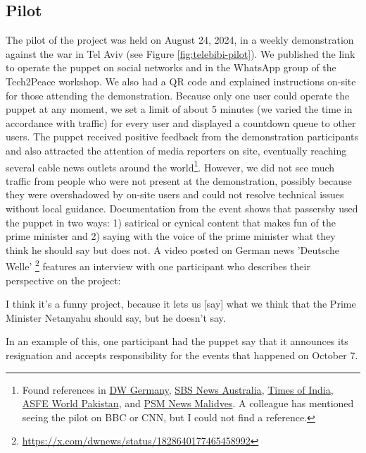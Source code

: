 \documentclass[dissertation,math,vertlayout,pdfa,colorlinks]{aaltoseries}
\begin{document}
\subsection{Pilot}
The pilot of the project was held on August 24, 2024, in a weekly demonstration against the war in Tel Aviv (see Figure \ref{fig:telebibi-pilot}). We published the link to operate the puppet on social networks and in the WhatsApp group of the Tech2Peace workshop. We also had a QR code and explained instructions on-site for those attending the demonstration. Because only one user could operate the puppet at any moment, we set a limit of about 5 minutes (we varied the time in accordance with traffic) for every user and displayed a countdown queue to other users. The puppet received positive feedback from the demonstration participants and also attracted the attention of media reporters on site, eventually reaching several cable news outlets around the world\footnote{Found references in \href{https://x.com/dwnews/status/1828640177465458992}{DW Germany}, \href{https://www.sbs.com.au/news/podcast-episode/un-says-israels-evacuations-in-gaza-are-preventing-delivery-of-much-needed-aid/zqa3zty03}{SBS News Australia}, \href{https://timesofindia.indiatimes.com/world/middle-east/israelis-demand-hostages-release-in-protest-against-netanyahus-government-in-tel-aviv/amp_etphotostory/112785127.cms}{Times of India}, \href{https://www.youtube.com/watch?v=v4O4sitNG-g}{ASFE World Pakistan}, and \href{https://www.youtube.com/live/Kd8cJ3snLKU?t=1384s}{PSM News Malidves}.  A colleague has mentioned seeing the pilot on BBC or CNN, but I could not find a reference.}. However, we did not see much traffic from people who were not present at the demonstration, possibly because they were overshadowed by on-site users and could not resolve technical issues without local guidance. Documentation from the event shows that passersby used the puppet in two ways: 1) satirical or cynical content that makes fun of the prime minister and 2) saying with the voice of the prime minister what they think he should say but does not. A video posted on German news 'Deutsche Welle' \footnote{\url{https://x.com/dwnews/status/1828640177465458992}} features an interview with one participant who describes their perspective on the project:
\begin{displayquote}
    I think it's a funny project, because it lets us [say] what we think that the Prime Minister Netanyahu should say, but he doesn't say.
\end{displayquote}
In an example of this, one participant had the puppet say that it announces its resignation and accepts responsibility for the events that happened on October 7.
\end{document}
